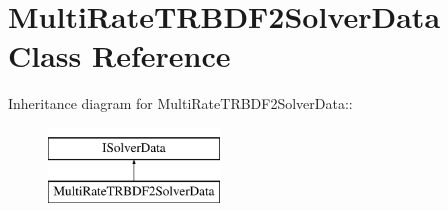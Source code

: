 \hypertarget{classMultiRateTRBDF2SolverData}{
\section{MultiRateTRBDF2SolverData Class Reference}
\label{classMultiRateTRBDF2SolverData}
}
Inheritance diagram for MultiRateTRBDF2SolverData::\begin{figure}[H]
\begin{center}
\leavevmode
\includegraphics[height=2cm]{classMultiRateTRBDF2SolverData}
\end{center}
\end{figure}
